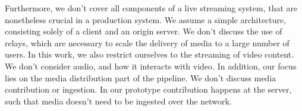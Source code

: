 Furthermore, we don't cover all components of a live streaming system, that are nonetheless crucial in a production system. We assume a simple architecture, consisting solely of a client and an origin server. We don't discuss the use of relays, which are necessary to scale the delivery of media to a large number of users. In this work, we also restrict ourselves to the streaming of video content. We don't consider audio, and how it interacts with video. In addition, our focus lies on the media distribution part of the pipeline. We don't discuss media contribution or ingestion. In our prototype contribution happens at the server, such that media doesn't need to be ingested over the network.